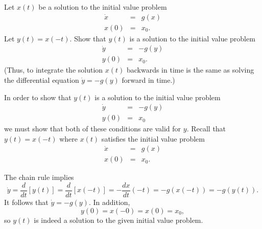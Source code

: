 \documentclass{ximera}
\begin{document}
\begin{exercise} \label{c3.3.7}
Let $x(t)$ be a solution to the initial value problem
\begin{eqnarray*}
\dot{x} & = & g(x) \\
x(0) & = & x_0.
\end{eqnarray*}
Let $y(t)=x(-t)$.  Show that $y(t)$ is a solution to the
initial value problem
\begin{eqnarray*}
\dot{y} & = & -g(y) \\
y(0) & = & x_0.
\end{eqnarray*}
(Thus, to integrate the solution $x(t)$ backwards in time is the
same as solving the differential equation $\dot{y}  =  -g(y)$
forward in time.)

\begin{solution}

In order to show that $y(t)$ is a solution to the initial value problem
\[
\begin{array}{rcl}
\dot{y} & = & -g(y) \\
y(0) & = & x_0\end{array}
\]
we must show that both of these conditions are valid for $y$.  Recall that
$y(t) = x(-t)$ where $x(t)$ satisfies the initial value problem
\[ \begin{array}{rcl}
\dot{x} & = & g(x) \\
x(0) & = & x_0.\end{array} \]

The chain rule implies
\[ \dot{y} = \frac{d}{dt}[y(t)] = \frac{d}{dt}[x(-t)] =
-\frac{dx}{dt}(-t) = -g(x(-t)) = -g(y(t)). \]
It follows that $\dot y = -g(y)$.
In addition,
\[ y(0) = x(-0) = x(0) = x_0, \]
so $y(t)$ is indeed a solution to the given initial value problem.

\end{solution}
\end{exercise}



\end{document}
